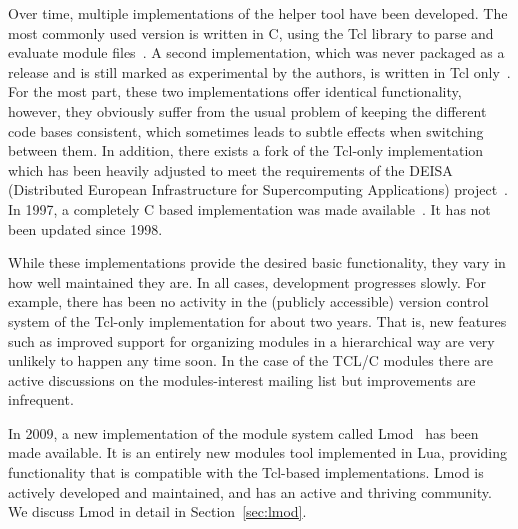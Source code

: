 Over time, multiple implementations of the helper tool
have been developed. The most commonly used version is written in C, using the Tcl
library to parse and evaluate module files~\cite{em}. A second implementation, which
was never packaged as a release and is still marked as experimental by the
authors, is written in Tcl only~\cite{em}. For the most part, these two implementations
offer identical functionality, however, they obviously suffer from the usual
problem of keeping the different code bases consistent, which sometimes leads
to subtle effects when switching between them. In addition, there exists a
fork of the Tcl-only implementation which has been heavily adjusted to meet
the requirements of the DEISA (Distributed European Infrastructure for
Supercomputing Applications) project~\cite{wikiDEISA}.  In
1997, a completely C based implementation was made
available~\cite{cmod}.  It has not been updated since 1998.  


While these implementations provide the desired basic functionality, they
vary in how well maintained they are. In all cases, development
progresses slowly. For example, there has been no activity in the
(publicly accessible) version control system of the Tcl-only
implementation for about two years. That is, new features such as
improved support for organizing modules in a hierarchical way are very 
unlikely to happen any time soon. In the case of the TCL/C modules
there are active discussions on the modules-interest mailing list but
improvements are infrequent.

In 2009, a new implementation of the module system called Lmod~\cite{taccLmod} has
been made available. It is an entirely new modules tool implemented in
Lua, providing functionality that is compatible with the Tcl-based
implementations.  Lmod is actively developed and maintained, and has
an active and thriving community. We discuss Lmod in detail in
Section~\ref{sec:lmod}. 


